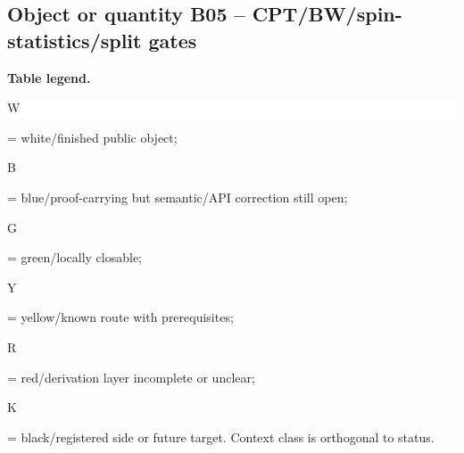 \subsection*{Object or quantity B05 -- CPT/\allowbreak{}BW/\allowbreak{}spin-statistics/\allowbreak{}split gates}
\hypertarget{objproof:B05}{}
\par\smallskip\noindent\begin{minipage}{0.99\linewidth}\footnotesize\raggedright\textbf{Table legend.} \colorbox{white}{\strut W} = white/finished public object; \colorbox{cyan!20}{\strut B} = blue/proof-carrying but semantic/API correction still open; \colorbox{green!18}{\strut G} = green/locally closable; \colorbox{yellow!25}{\strut Y} = yellow/known route with prerequisites; \colorbox{red!20}{\strut R} = red/derivation layer incomplete or unclear; \colorbox{black!18}{\strut K} = black/registered side or future target. Context class is orthogonal to status.\end{minipage}\par\vspace{0.25em}
